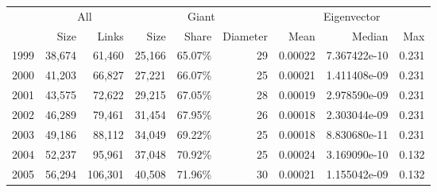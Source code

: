 \begin{tabular}{lrr|rrr|rrr}
\toprule
{} & \multicolumn{2}{c}{All} & \multicolumn{3}{c}{Giant} & \multicolumn{3}{c}{Eigenvector} \\
{} &    Size &    Links &    Size &   Share & Diameter &        Mean &        Median &    Max \\
\midrule
1999 &  38,674 &   61,460 &  25,166 &  65.07\% &       29 &     0.00022 &  7.367422e-10 &  0.231 \\
2000 &  41,203 &   66,827 &  27,221 &  66.07\% &       25 &     0.00021 &  1.411408e-09 &  0.231 \\
2001 &  43,575 &   72,622 &  29,215 &  67.05\% &       28 &     0.00019 &  2.978590e-09 &  0.231 \\
2002 &  46,289 &   79,461 &  31,454 &  67.95\% &       26 &     0.00018 &  2.303044e-09 &  0.231 \\
2003 &  49,186 &   88,112 &  34,049 &  69.22\% &       25 &     0.00018 &  8.830680e-11 &  0.231 \\
2004 &  52,237 &   95,961 &  37,048 &  70.92\% &       25 &     0.00024 &  3.169090e-10 &  0.132 \\
2005 &  56,294 &  106,301 &  40,508 &  71.96\% &       30 &     0.00021 &  1.155042e-09 &  0.132 \\
\bottomrule
\end{tabular}
